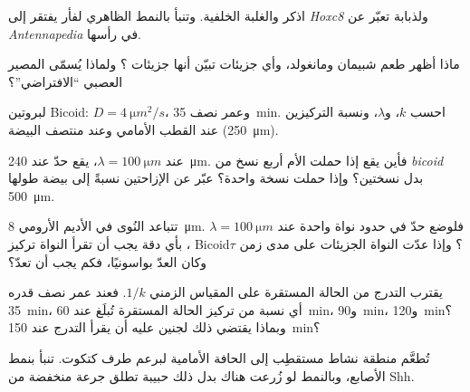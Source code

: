 \begin{exercise}[$\star$]\label{exo:b3:developmental-genetics:3}
اذكر  والغلبة الخلفية. وتنبأ بالنمط الظاهري
لفأر يفتقر إلى \emph{Hoxc8} ولذبابة تعبّر عن
\emph{Antennapedia} في رأسها.
\end{exercise}

\begin{exercise}[$\star$]\label{exo:b3:developmental-genetics:4}
ماذا أظهر طعم شبيمان ومانغولد، وأي جزيئات تبيّن أنها جزيئات
؟ ولماذا يُسمّى المصير العصبي ``الافتراضي''؟
\end{exercise}

\begin{exercise}[$\star\star$]\label{exo:b3:developmental-genetics:5}
لبروتين Bicoid: $D = \qty{4}{\micro m^2/s}$، وعمر نصف
\qty{35}{min}. احسب $k$، و$\lambda$، ونسبة التركيزين عند
القطب الأمامي وعند منتصف البيضة (\qty{250}{\micro m}).
\end{exercise}

\begin{exercise}[$\star\star$]\label{exo:b3:developmental-genetics:6}
عند $\lambda = \qty{100}{\micro m}$، يقع حدّ عند
\qty{240}{\micro m}. فأين يقع إذا حملت الأم أربع نسخ من
\emph{bicoid} بدل نسختين؟ وإذا حملت نسخة واحدة؟ عبّر عن
الإزاحتين نسبةً إلى بيضة طولها \qty{500}{\micro m}.
\end{exercise}

\begin{exercise}[$\star\star$]\label{exo:b3:developmental-genetics:7}
تتباعد النُوى في الأديم الأرومي \qty{8}{\micro m}. فلوضع حدّ
في حدود نواة واحدة عند $\lambda = \qty{100}{\micro m}$، بأي
دقة يجب أن تقرأ النواة تركيز Bicoid؟ وإذا عدّت النواة
الجزيئات على مدى زمن $\tau$ وكان العدّ بواسونيًا، فكم يجب أن
تعدّ؟
\end{exercise}

\begin{exercise}[$\star\star$]\label{exo:b3:developmental-genetics:8}
يقترب التدرج من الحالة المستقرة على المقياس الزمني $1/k$.
فعند عمر نصف قدره \qty{35}{min}، أي نسبة من تركيز الحالة
المستقرة تُبلَغ عند \qty{60}{min}، و\qty{90}{min}، و\qty{120}{min}؟
وبماذا يقتضي ذلك لجنين عليه أن يقرأ التدرج عند \qty{150}{min}؟
\end{exercise}

\begin{exercise}[$\star\star$]\label{exo:b3:developmental-genetics:9}
تُطعَّم منطقة نشاط مستقطِب إلى الحافة الأمامية لبرعم طرف
كتكوت. تنبأ بنمط الأصابع، وبالنمط لو زُرعت هناك بدل ذلك
حبيبة تطلق جرعة منخفضة من Shh.
\end{exercise}

